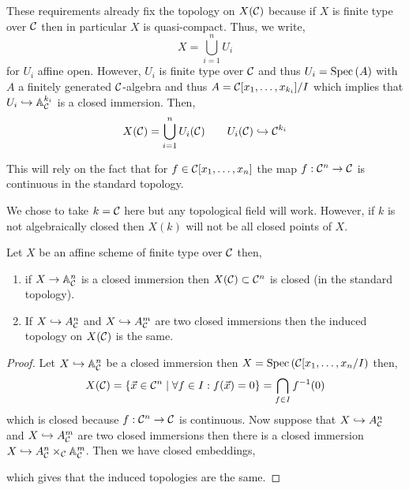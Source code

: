 \documentclass[12pt]{article}
\begin{document}
\begin{remark}
These requirements already fix the topology on $X(\mathcal{C})$ because if $X$ is finite type over $\mathcal{C}$ then in particular $X$ is quasi-compact. Thus, we write,
\[ X = \bigcup_{i = 1}^n U_i \]
for $U_i$ affine open. However, $U_i$ is finite type over $\mathcal{C}$ and thus $U_i = \mathrm{Spec}\left( A \right)$ with $A$ a finitely generated $\mathcal{C}$-algebra and thus $A = \mathcal{C}[x_1, \dots, x_{k_i}] / I$ which implies that $U_i \hookrightarrow \mathbb{A}_{\mathcal{C}}^{k_i}$ is a closed immersion. Then,
\[ X(\mathcal{C}) = \bigcup_{i = 1}^n U_i(\mathcal{C}) \quad \quad U_i(\mathcal{C}) \hookrightarrow \mathcal{C}^{k_i} \]
\end{remark}

\begin{remark}
This will rely on the fact that for $f \in \mathcal{C}[x_1, \dots, x_n]$ the map $f : \mathcal{C}^n \to \mathcal{C}$ is continuous in the standard topology.   
\end{remark}

\begin{remark}
We chose to take $k = \mathcal{C}$ here but any topological field will work. However, if $k$ is not algebraically closed then $X(k)$ will not be all closed points of $X$.
\end{remark}

\begin{lemma}
Let $X$ be an affine scheme of finite type over $\mathcal{C}$ then,
\begin{enumerate}
\item if $X \to \mathbb{A}^n_{\mathcal{C}}$ is a closed immersion then $X(\mathcal{C}) \subset \mathcal{C}^n$ is closed (in the standard topology).
\item If $X \hookrightarrow A^n_{\mathcal{C}}$ and $X \hookrightarrow A^m_{\mathcal{C}}$ are two closed immersions then the induced topology on $X(\mathcal{C})$ is the same. 
\end{enumerate}
\end{lemma}

\begin{proof}
Let $X \hookrightarrow \mathbb{A}^n_{\mathcal{C}}$ be a closed immersion then $X = \mathrm{Spec}\left( \mathcal{C}[x_1, \dots, x_n / I \right)$ then,
\[ X(\mathcal{C}) = \{ \vec{x} \in \mathcal{C}^n \mid \forall f \in I : f(\vec{x}) = 0 \} = \bigcap_{f \in I} f^{-1}(0) \]
which is closed because $f : \mathcal{C}^n \to \mathcal{C}$ is continuous. Now suppose that $X \hookrightarrow A^n_{\mathcal{C}}$ and $X \hookrightarrow A^m_{\mathcal{C}}$ are two closed immersions then there is a closed immersion $X \hookrightarrow A_{\mathcal{C}}^n \times_{\mathcal{C}} \mathbb{A}_{\mathcal{C}}^m$. Then we have closed embeddings,
\begin{center}
\end{center}
which gives that the induced topologies are the same. 
\end{proof}
\end{document}
